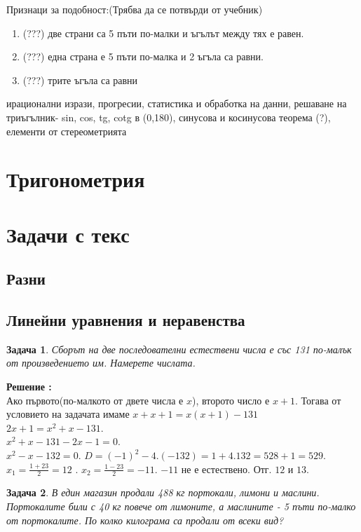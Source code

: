 \documentclass{article}
\newtheorem{problem}{Задача}
\newcounter{solution}
\newcommand\solution{%
	\stepcounter{solution}%
	\textbf{Решение :}\\%
}
\begin{document}
		Признаци за подобност:(Трябва да се потвърди от учебник)
	\begin{enumerate}
		\item (???) две страни са 5 пъти по-малки и ъгълът между тях е равен.
		\item (???) една страна е 5 пъти по-малка и 2 ъгъла са равни.
 		\item  (???) трите ъгъла са равни
 	\end{enumerate}
	
	
	
	\vspace{2cm}
	ирационални изрази, прогресии, статистика и обработка на данни, 
	решаване на триъгълник- sin, cos, tg, cotg в (0,180), синусова и косинусова теорема (?), елементи от стереометрията
	
		

\section{Тригонометрия}


\section{Задачи с текс}

\subsection{Разни}


\subsection{Линейни уравнения и неравенства}

\begin{problem}
	Сборът на две последователни естествени числа е със 131 по-малък от произведението им. Намерете числата.	
\end{problem}
\solution
 Ако първото(по-малкото от двете числа е $x$), второто число е $x+1$. Тогава от условието на задачата имаме 
 $ x + x+1 = x(x+1) - 131 $ \\ $2x + 1 = x^2 + x - 131.$ \\
 $x^2 + x - 131  -2x -1 = 0.$ \\
 $ x^2 -x -132 = 0.$
$D = (-1)^2 - 4.(-132) = 1 + 4.132 = 528+1 =529.$
$x_1 = \frac{1 +23}{2} = 12 $ . $x_2 = \frac{1 - 23}{2} = -11$. $-11$ не е естествено.
Отг. $12$ и $13$.

\begin{problem}
	В един магазин продали 488 кг портокали, лимони и маслини. Портокалите били с 40 кг повече от лимоните, а маслините - 5 пъти по-малко от портокалите. По колко килограма са продали от всеки вид?
\end{problem}
\end{document}
